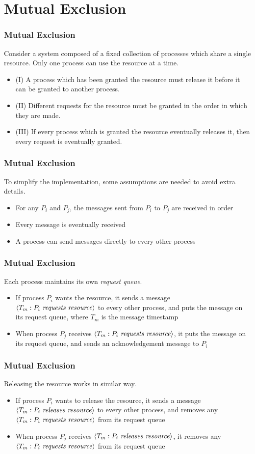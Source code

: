 \documentclass{beamer}
\begin{document}
\section{Mutual Exclusion}
\frame
{
  \frametitle{Mutual Exclusion}
  Consider a system composed of a fixed collection of processes which share a single resource. Only one process can use the resource at a time.

  \begin{itemize}
  	\item (I) A process which has been granted the resource must release it before it can be granted to another process.
  	\item (II) Different requests for the resource must be granted in the order in which they are made.
  	\item (III) If every process which is granted the resource eventually releases it, then every request is eventually granted.
  \end{itemize}
}

\frame
{
  \frametitle{Mutual Exclusion}

  To simplify the implementation, some assumptions are needed to avoid extra details.
  \begin{itemize}
  	\item<2-> For any $P_i$ and $P_j$, the messages sent from $P_i$ to $P_j$ are received in order
  	\item<3-> Every message is eventually received
  	\item<4-> A process can send messages directly to every other process
  \end{itemize}
}

\frame
{
  \frametitle{Mutual Exclusion}

  Each process maintains its own \emph{request queue}.

  \begin{itemize}
  	\item<2-> If process $P_i$ wants the resource, it sends a message $\langle T_m:P_i\text{ \emph{requests resource}}\rangle$ to every other process, and puts the message on its request queue, where $T_m$ is the message timestamp
  	\item<3-> When process $P_j$ receives $\langle T_m:P_i\text{ \emph{requests resource}}\rangle$, it puts the message on its request queue, and sends an acknowledgement message to $P_i$
  \end{itemize}
}

\frame
{
  \frametitle{Mutual Exclusion}

  Releasing the resource works in similar way.

  \begin{itemize}
  	\item<2-> If process $P_i$ wants to release the resource, it sends a message $\langle T_m:P_i\text{ \emph{releases resource}}\rangle$ to every other process, and removes any $\langle T_m:P_i\text{ \emph{requests resource}}\rangle$ from its request queue
  	\item<3-> When process $P_j$ receives $\langle T_m:P_i\text{ \emph{releases resource}}\rangle$, it removes any $\langle T_m:P_i\text{ \emph{requests resource}}\rangle$ from its request queue
  \end{itemize}
}
\end{document}

